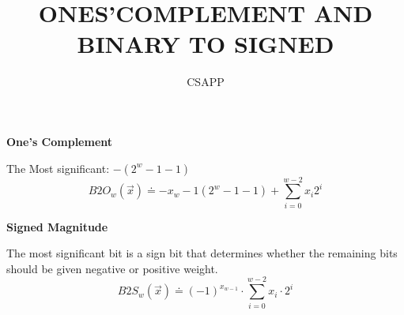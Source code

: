 \documentclass{article}
\title{\small ONES'COMPLEMENT AND BINARY TO SIGNED}
\author{CSAPP}
\begin{document}
    \maketitle
    \textbf{One's Complement}
    \begin{center}
        The Most significant: $-(2^w-1 - 1)$
        \smallbreak
        \[B2O_w(\vec{x}) \doteq -x_w-1(2^w-1 - 1) + \sum_{i=0}^{w-2}x_i2^i\]
    \end{center}
    \smallskip
    \textbf{Signed Magnitude}
    \begin{center}
        The most significant bit is a sign bit that determines whether the remaining bits
        should be given negative or positive weight.
         \[B2S_w(\vec{x}) \doteq (-1)^{x_{w-1}} \cdot \sum_{i=0}^{w-2} x_i \cdot 2^i\]

    \end{center}
\end{document}
